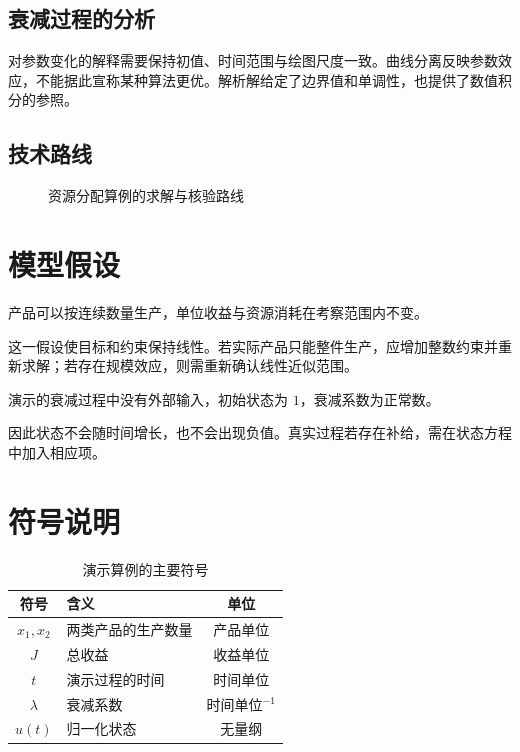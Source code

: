 \documentclass[UTF8,a4paper,zihao=-4,fontset=fandol]{ctexart}
\begin{document}
\subsection{衰减过程的分析}
对参数变化的解释需要保持初值、时间范围与绘图尺度一致。曲线分离反映参数效应，不能据此宣称某种算法更优。解析解给定了边界值和单调性，也提供了数值积分的参照。
\subsection{技术路线}
\begin{figure}[htbp]
\centering
{}
\caption{资源分配算例的求解与核验路线}
\label{fig:demo-route}
\end{figure}

\section{模型假设}
\begin{assumption}
产品可以按连续数量生产，单位收益与资源消耗在考察范围内不变。
\end{assumption}
这一假设使目标和约束保持线性。若实际产品只能整件生产，应增加整数约束并重新求解；若存在规模效应，则需重新确认线性近似范围。
\begin{assumption}
演示的衰减过程中没有外部输入，初始状态为 $1$，衰减系数为正常数。
\end{assumption}
因此状态不会随时间增长，也不会出现负值。真实过程若存在补给，需在状态方程中加入相应项。

\section{符号说明}
\begin{table}[htbp]
\centering
\caption{演示算例的主要符号}
\label{tab:demo-symbols}
\begin{tabularx}{\textwidth}{cYc}
\toprule 符号 & 含义 & 单位 \\ \midrule
$x_1,x_2$ & 两类产品的生产数量 & 产品单位 \\
$J$ & 总收益 & 收益单位 \\
$t$ & 演示过程的时间 & 时间单位 \\
$\lambda$ & 衰减系数 & 时间单位$^{-1}$ \\
$u(t)$ & 归一化状态 & 无量纲 \\
\bottomrule
\end{tabularx}
\end{table}
\end{document}

